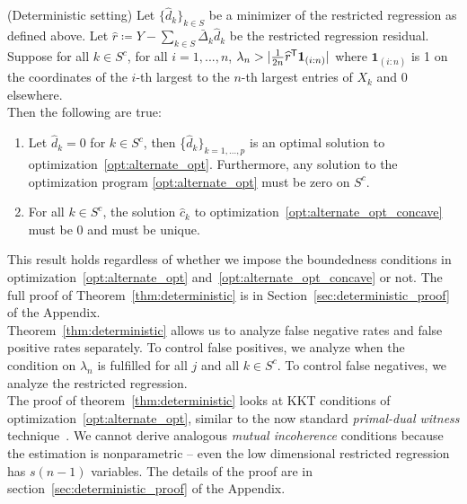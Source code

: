 \begin{theorem} (Deterministic setting)
\label{thm:deterministic}
Let $\{\hat{d}_k \}_{k \in S}$ be a minimizer of the restricted regression as defined above.
Let $\hat{r} \coloneqq Y - \sum_{k \in S} \bar{\Delta}_k \hat{d}_k$ be the restricted regression residual. \\

Suppose for all $k\in S^c$, for all $i=1,...,n$, $\lambda_n > | \frac{1}{2n}
\widehat{r}^{\mathsf{T}} \mbox{\boldmath $1$}_{(i:n)}|$ where $\mathbf{1}_{(i:n)}$ is 1 on the coordinates of the $i$-th largest to the $n$-th largest entries of $X_k$ and 0 elsewhere.\\

Then the following are true:
\begin{enumerate}
\item Let $\hat{d}_k = 0$ for $k \in S^c$, then \{$\hat{d}_k\}_{k=1,...,p}$ is an optimal solution to optimization~\ref{opt:alternate_opt}. Furthermore, any solution to the optimization program \ref{opt:alternate_opt} must be zero on $S^c$.
\item For all $k \in S^c$, the solution $\hat{c}_k$ to optimization~\ref{opt:alternate_opt_concave} must be 0 and must be unique.
\end{enumerate}

\end{theorem}

This result holds regardless of whether we impose the boundedness conditions in optimization~\ref{opt:alternate_opt} and~\ref{opt:alternate_opt_concave} or not.
The full proof of Theorem~\ref{thm:deterministic} is in Section~\ref{sec:deterministic_proof} of the Appendix.\\

Theorem~\ref{thm:deterministic} allows us to analyze false negative
rates and false positive rates separately. To control false positives,
we analyze when the condition on $\lambda_n$ is fulfilled for all $j$ and all $k \in S^c$. To control false negatives, we analyze the restricted regression. \\

The proof of theorem~\ref{thm:deterministic} looks at KKT conditions of optimization~\ref{opt:alternate_opt}, similar to the now standard \emph{primal-dual witness} technique~\cite{wainwright2009sharp}. We cannot derive analogous \emph{mutual incoherence} conditions because the estimation is nonparametric -- even the low dimensional restricted regression has $s(n-1)$ variables. The details of the proof are in section~\ref{sec:deterministic_proof} of the Appendix.

